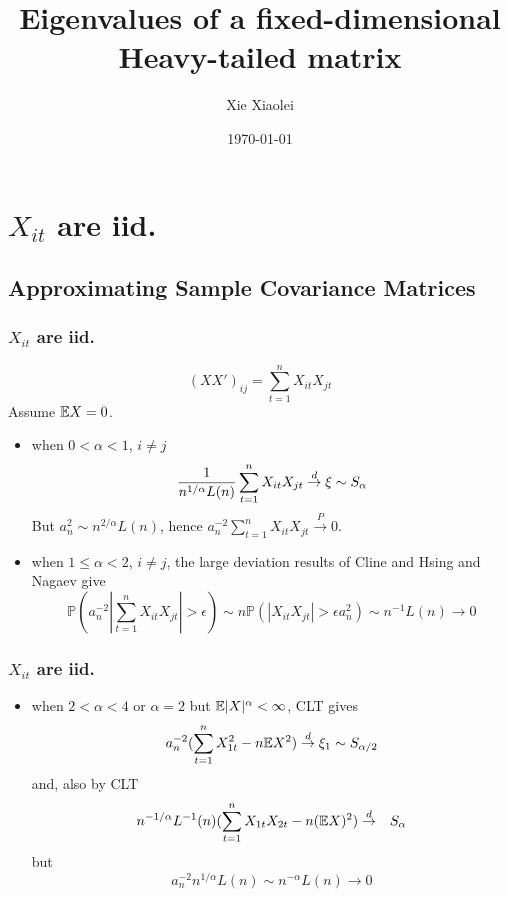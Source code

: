 \documentclass{beamer}
\title{Eigenvalues of a fixed-dimensional Heavy-tailed matrix} %
\author{Xie Xiaolei} %
\institute[UCPH] %
{
Copenhagen University  \\ %
\medskip
\textit{xie.xiaolei@gmail.com} %
}
\date{\today} %
\renewcommand{\P}{
\mathbb P
}
\begin{document}
\begin{frame}
\titlepage %
\end{frame}


\section[iid data]{$X_{it}$ are iid.}
\subsection{Approximating Sample Covariance Matrices}
\begin{frame}
  \frametitle{$X_{it}$ are iid.}
  $$
  (XX')_{ij} = \sum_{t=1}^n X_{it}X_{jt}
  $$
  Assume $\mathbb{E} X = 0$.
  \begin{itemize}
  \item when $0 < \alpha < 1$, $i \neq j$
    $$
    {1 \over n^{1/\alpha} L(n)} \sum_{t=1}^n X_{it}X_{jt}
    \overset{d}{\to} \xi \sim S_{\alpha}
    $$
    But $a_n^2 \sim n^{2/\alpha} L(n)$, hence $a_n^{-2} \sum_{t=1}^n
    X_{it}X_{jt} \overset{P}{\to} 0$.

  \item when $1 \leq \alpha < 2$, $i \neq j$, the large
    deviation results of Cline and Hsing \cite{ClingHsing1998} and
    Nagaev \cite{nagaev1979} give
    \[
    \P(a_n^{-2} |\sum_{t=1}^n X_{it}X_{jt}| > \epsilon) \sim n
    \P(|X_{it}X_{jt}| > \epsilon a_n^2) \sim n^{-1} L(n) \to 0
    \]
  \end{itemize}
\end{frame}

\begin{frame}
  \frametitle{$X_{it}$ are iid.}
  \begin{itemize}
  \item when $2 < \alpha < 4$ or $\alpha = 2$ but $\mathbb{E}|X|^{\alpha} <
    \infty$, CLT gives
    $$
    a_n^{-2}(\sum_{t=1}^n X_{1t}^2 - n \mathbb{E} X^2) \overset{d}{\to} \xi_1
    \sim S_{\alpha/2}
    $$
    and, also by CLT
    \begin{eqnarray*}
      n^{-1/\alpha} L^{-1}(n)(\sum_{t=1}^n X_{1t}X_{2t} - n (\mathbb{E} X)^2)
      &\overset{d}{\to}& S_{\alpha} \\
    \end{eqnarray*}
    but
    $$
    a_n^{-2} n^{1/\alpha} L(n) \sim n^{-\alpha} L(n) \to 0
    $$
  \end{itemize}
\end{frame}
\end{document}
